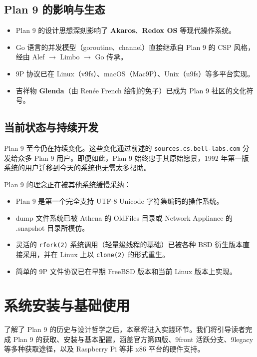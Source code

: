 \documentclass[12pt,UTF8]{ctexbook}
\begin{document}
\section{Plan 9 的影响与生态}

\begin{itemize}
\item Plan 9 的设计思想深刻影响了 \textbf{Akaros}、\textbf{Redox OS} 等现代操作系统。
\item Go 语言的并发模型（goroutine、channel）直接继承自 Plan 9 的 CSP 风格，经由 Alef $\to$ Limbo $\to$ Go 传承。
\item 9P 协议已在 Linux（v9fs）、macOS（Mac9P）、Unix（u9fs）等多平台实现。
\item 吉祥物 \textbf{Glenda}（由 Renée French 绘制的兔子）已成为 Plan 9 社区的文化符号。
\end{itemize}

\section{当前状态与持续开发}

Plan 9 至今仍在持续变化。这些变化通过前述的 \texttt{sources.cs.bell-labs.com} 分发给众多 Plan 9 用户。即便如此，Plan 9 始终忠于其原始愿景，1992 年第一版系统的用户迁移到今天的系统也无需太多帮助。

Plan 9 的理念正在被其他系统缓慢采纳：

\begin{itemize}
\item Plan 9 是第一个完全支持 UTF-8 Unicode 字符集编码的操作系统。
\item dump 文件系统已被 Athena 的 OldFiles 目录或 Network Appliance 的 .snapshot 目录所模仿。
\item 灵活的 \texttt{rfork(2)} 系统调用（轻量级线程的基础）已被各种 BSD 衍生版本直接采用，并在 Linux 上以 \texttt{clone(2)} 的形式重生。
\item 简单的 9P 文件协议已在早期 FreeBSD 版本和当前 Linux 版本上实现。
\end{itemize}
	
\chapter{系统安装与基础使用}
	
了解了 Plan 9 的历史与设计哲学之后，本章将进入实践环节。我们将引导读者完成 Plan 9 的获取、安装与基本配置，涵盖官方第四版、9front 活跃分支、9legacy 等多种获取途径，以及 Raspberry Pi 等非 x86 平台的硬件支持。
\end{document}
